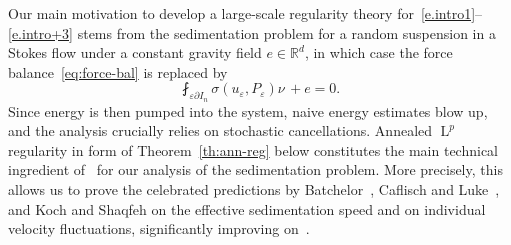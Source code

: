 \documentclass[10pt]{amsart}
\theoremstyle{plain}
\theoremstyle{definition}
\newcommand{\e}{\varepsilon}
\newcommand{\R}{\mathbb R}
\newcommand{\ee}{e}
\newcommand{\Ld}{\operatorname{L}}
\begin{document}
Our main motivation to develop a large-scale regularity theory for~\eqref{e.intro1}--\eqref{e.intro+3} stems from the sedimentation problem for a random suspension in a Stokes flow under a constant gravity field $\ee\in\R^d$, in which case the force balance~\eqref{eq:force-bal} is replaced by
\[\fint_{\e\partial I_n}\sigma(u_\e,P_\e)\nu\,+\ee=0.\]
Since energy is then pumped into the system, naive energy estimates blow up, and the analysis crucially relies on stochastic cancellations.
Annealed $\Ld^p$ regularity in form of Theorem~\ref{th:ann-reg} below constitutes the main technical ingredient of~\cite{DG-20} for our analysis of the sedimentation problem.
More precisely,
this allows us to prove the celebrated predictions by Batchelor~\cite{Batchelor-72}, Caflisch and Luke~\cite{Caflisch-Luke}, and Koch and Shaqfeh \cite{KS-91} on the effective sedimentation speed and on individual velocity fluctuations, significantly improving on~\cite{Gloria-19}.
\end{document}
